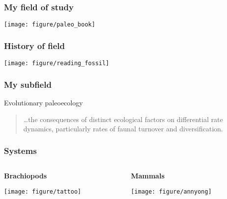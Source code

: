 \documentclass{beamer}
\begin{document}
\begin{frame}
  \frametitle{My field of study}
  \begin{center}
    \texttt{[image: figure/paleo\_book]}
  \end{center}
\end{frame}

\begin{frame}
  \frametitle{History of field}
  \begin{center}
    \texttt{[image: figure/reading\_fossil]}
  \end{center}
\end{frame}

\begin{frame}
  \frametitle{My subfield}
  \begin{block}{Evolutionary paleoecology}
    \begin{quotation}
      \dots the consequences of distinct ecological factors on differential rate dynamics, particularly rates of faunal turnover and diversification.

      \tiny{}
    \end{quotation}
  \end{block}
\end{frame}

\begin{frame}
  \frametitle{Systems}

  \begin{columns}
    \begin{column}{0.5\textwidth}
      \begin{center}
        \textbf{Brachiopods}

        \vspace{0.5cm}

        \texttt{[image: figure/tattoo]}
      \end{center}
    \end{column}
    \begin{column}{0.5\textwidth}
      \begin{center}
        \textbf{Mammals}

        \vspace{0.5cm}

        \texttt{[image: figure/annyong]}
      \end{center}
    \end{column}
  \end{columns}
\end{frame}
\end{document}
